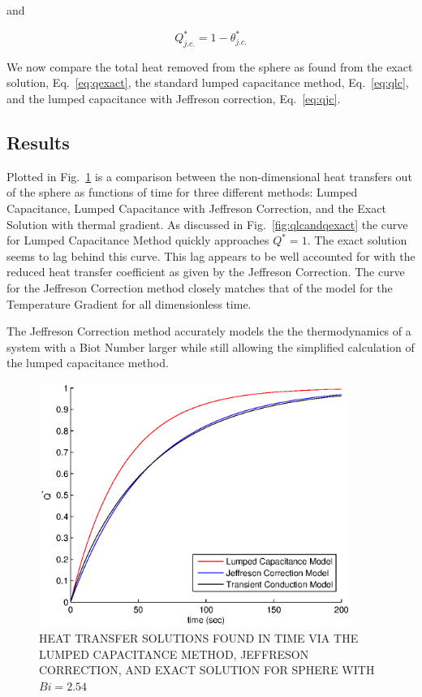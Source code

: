 and

\begin{equation}
\label{eq:qjc}
	Q^*_{j.c.}=1-\theta^*_{j.c.}
\end{equation}

We now compare the total heat removed from the sphere as found from the exact solution, Eq.~\ref{eq:qexact}, the standard lumped capacitance method, Eq.~\ref{eq:qlc}, and the lumped capacitance with Jeffreson correction, Eq.~\ref{eq:qjc}.

\subsection{Results}
Plotted in Fig.~\ref{qvstime_lc_jc_tg} is a comparison between the non-dimensional heat transfers out of the sphere as functions of time for three different methods: Lumped Capacitance, Lumped Capacitance with Jeffreson Correction, and the Exact Solution with thermal gradient. As discussed in Fig.~\ref{fig:qlcandqexact}  the curve for Lumped Capacitance Method quickly approaches $Q^*=1$. The exact solution seems to lag behind this curve. This lag appears to be well accounted for with the reduced heat transfer coefficient as given by the Jeffreson Correction.  The curve for the Jeffreson Correction method closely matches that of the model for the Temperature Gradient for all dimensionless time.  

The Jeffreson Correction method accurately models the the thermodynamics of a system with a Biot Number larger while still allowing the simplified calculation of the lumped capacitance method.

\begin{figure}[ht]
	\begin{center}
		\includegraphics[width=4in]{chapters/figures/Qvstime_lc_jc_tg} 
	\end{center}
	\caption[Heat transfer solutions with correction for single sphere]{HEAT TRANSFER SOLUTIONS FOUND IN TIME VIA THE LUMPED CAPACITANCE METHOD, JEFFRESON CORRECTION, AND EXACT SOLUTION FOR SPHERE WITH $Bi=2.54$}
	\label{qvstime_lc_jc_tg} 
\end{figure}












